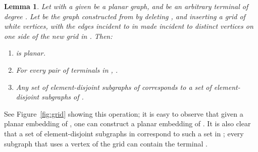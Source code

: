 \documentclass[11pt]{article}
\newtheorem{lemma}{Lemma}[section]
\newenvironment{proofsketch}{\vspace{-0.1in}\noindent{\bf Proof Sketch:}}{\hspace*{\fill}\par}
\begin{document}
\begin{lemma}
  Let  with a given  be a planar graph, and  be an arbitrary terminal of degree . Let  be the graph
  constructed from  by deleting , and inserting a 
  grid of white vertices, with the edges incident to  in  made
  incident to distinct vertices on one side of the new grid in
  . Then:
  \begin{enumerate}
    \item  is planar.
    \item For every pair  of terminals in ,
      .
    \item Any set of element-disjoint subgraphs of  corresponds to a
      set of element-disjoint subgraphs of .
  \end{enumerate}
\end{lemma}

\begin{proofsketch}
  See Figure~\ref{fig:grid} showing this operation; it is easy to
  observe that given a planar embedding of , one can construct a
  planar embedding of . It is also clear that a set of
  element-disjoint subgraphs in  correspond to such a set in ;
  every subgraph that uses a vertex of the grid can contain the
  terminal .

  \begin{figure} 
    \begin{center}
\end{center}
\end{figure}
\end{proofsketch}
\end{document}
